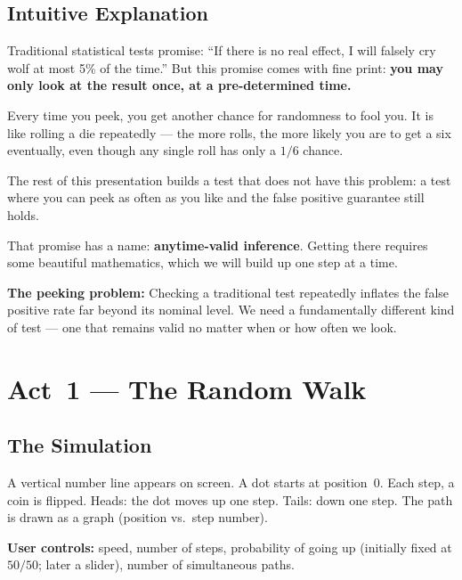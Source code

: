 \documentclass[12pt, a4paper]{article}
\begin{document}
\subsection{Intuitive Explanation}

\begin{intuition}
Traditional statistical tests promise: ``If there is no real effect, I will
falsely cry wolf at most 5\% of the time.''  But this promise comes with fine
print: \textbf{you may only look at the result once, at a pre-determined time.}

Every time you peek, you get another chance for randomness to fool you.  It is
like rolling a die repeatedly --- the more rolls, the more likely you are to
get a six eventually, even though any single roll has only a $1/6$ chance.

The rest of this presentation builds a test that does not have this problem:
a test where you can peek as often as you like and the false positive guarantee
still holds.

That promise has a name: \textbf{anytime-valid inference}.  Getting there
requires some beautiful mathematics, which we will build up one step at a
time.
\end{intuition}

\begin{keytakeaway}
\textbf{The peeking problem:} Checking a traditional test repeatedly inflates
the false positive rate far beyond its nominal level.  We need a fundamentally
different kind of test --- one that remains valid no matter when or how often
we look.
\end{keytakeaway}


\newpage
\section{Act~1 --- The Random Walk}

\subsection{The Simulation}

\begin{simulation}
A vertical number line appears on screen.  A dot starts at position~0.  Each
step, a coin is flipped.  Heads: the dot moves up one step.  Tails: down one
step.  The path is drawn as a graph (position vs.\ step number).

\textbf{User controls:} speed, number of steps, probability of going up
(initially fixed at $50/50$; later a slider), number of simultaneous paths.
\end{simulation}
\end{document}
